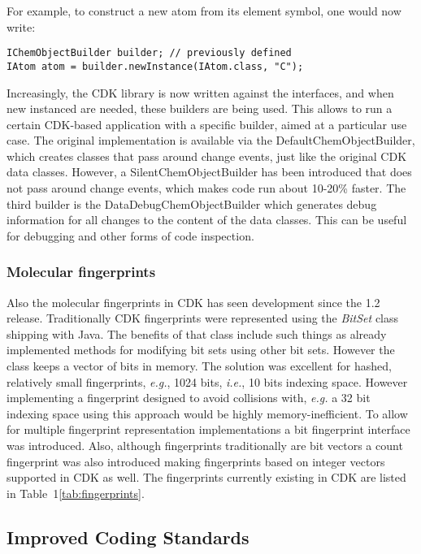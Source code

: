 \documentclass[10pt]{bmcart}
\begin{document}
For example, to construct a new atom from its element symbol, one would now write:

\begin{verbatim}
IChemObjectBuilder builder; // previously defined
IAtom atom = builder.newInstance(IAtom.class, "C");
\end{verbatim}

Increasingly, the CDK library is now written against the interfaces, and when new instanced
are needed, these builders are being used. This allows to run a certain CDK-based
application with a specific builder, aimed at a particular use case. The original
implementation is available via the DefaultChemObjectBuilder, which creates
classes that pass around change events, just like the original CDK data classes.
However, a SilentChemObjectBuilder has been introduced that does not pass around
change events, which makes code run about 10-20\% faster.
The third builder is the DataDebugChemObjectBuilder which generates debug information
for all changes to the content of the data classes. This can be useful for
debugging and other forms of code inspection.

\subsubsection*{Molecular fingerprints}
Also the molecular fingerprints in CDK has seen development since the 1.2
release. Traditionally CDK fingerprints were represented using the
\textit{BitSet} class shipping with Java. The benefits of that class include
such things as already implemented methods for modifying bit sets using other
bit sets. However the class keeps a vector of bits in memory. The solution was
excellent for hashed, relatively small fingerprints, \textit{e.g.}, 1024 bits,
\textit{i.e.}, 10 bits indexing space. However implementing a fingerprint
designed to avoid collisions with, \textit{e.g.} a 32 bit indexing space using
this approach would be highly memory-inefficient. To allow for multiple
fingerprint representation implementations a bit fingerprint interface was
introduced. Also, although fingerprints traditionally are bit vectors a count
fingerprint was also introduced making fingerprints based on integer vectors
supported in CDK as well. The fingerprints currently existing in CDK are listed
in Table~1\ref{tab:fingerprints}.


\subsection*{Improved Coding Standards}
\end{document}
